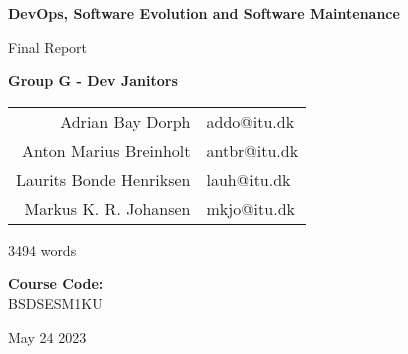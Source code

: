 
\begin{titlepage}
    \begin{center}
       \vspace*{0.5cm}

        \huge
        \textbf{DevOps, Software Evolution and Software Maintenance}

        \vspace{0.5cm}
        \Large
        Final Report
            
        \vspace{1.5cm}

        \large
        \textbf{Group G - Dev Janitors} \\
        \vspace{0.25cm}
        \begin{tabular}{r l}
            Adrian Bay Dorph & addo@itu.dk        \\
            Anton Marius Breinholt & antbr@itu.dk        \\
            Laurits Bonde Henriksen & lauh@itu.dk \\
            Markus K. R. Johansen & mkjo@itu.dk   \\
        \end{tabular}

        \vspace{0.5cm}
        3494 words
        
        \vspace{5cm}
        \large
        \textbf{Course Code:}\\
        BSDSESM1KU
        
        \vfill

        

        \vspace{0.8cm}
        May 24 2023
    \end{center}
\end{titlepage}
